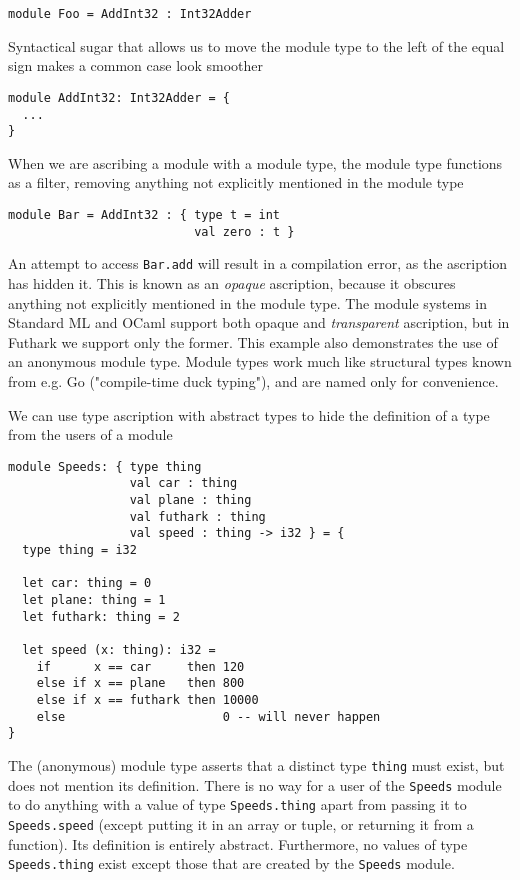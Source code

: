 \documentclass[oneside,11pt]{book}
\begin{document}
\begin{lstlisting}
module Foo = AddInt32 : Int32Adder
\end{lstlisting}

Syntactical sugar that allows us to move the module type to the left
of the equal sign makes a common case look smoother

\begin{lstlisting}
module AddInt32: Int32Adder = {
  ...
}
\end{lstlisting}

When we are ascribing a module with a module type, the module type
functions as a filter, removing anything not explicitly mentioned in
the module type

\begin{lstlisting}
module Bar = AddInt32 : { type t = int
                          val zero : t }
\end{lstlisting}

An attempt to access \texttt{Bar.add} will result in a compilation
error, as the ascription has hidden it.  This is known as an
\textit{opaque} ascription, because it obscures anything not
explicitly mentioned in the module type.  The module systems in
Standard ML and OCaml support both opaque and \textit{transparent}
ascription, but in Futhark we support only the former.  This example
also demonstrates the use of an anonymous module type.  Module types
work much like structural types known from e.g. Go ("compile-time duck
typing"), and are named only for convenience.

We can use type ascription with abstract types to hide the definition
of a type from the users of a module

\begin{lstlisting}
module Speeds: { type thing
                 val car : thing
                 val plane : thing
                 val futhark : thing
                 val speed : thing -> i32 } = {
  type thing = i32

  let car: thing = 0
  let plane: thing = 1
  let futhark: thing = 2

  let speed (x: thing): i32 =
    if      x == car     then 120
    else if x == plane   then 800
    else if x == futhark then 10000
    else                      0 -- will never happen
}
\end{lstlisting}

The (anonymous) module type asserts that a distinct type \texttt{thing}
must exist, but does not mention its definition.  There is no way for
a user of the \texttt{Speeds} module to do anything with a value of type
\texttt{Speeds.thing} apart from passing it to \texttt{Speeds.speed} (except
putting it in an array or tuple, or returning it from a function).
Its definition is entirely abstract.  Furthermore, no values of type
\texttt{Speeds.thing} exist except those that are created by the \texttt{Speeds}
module.
\end{document}
